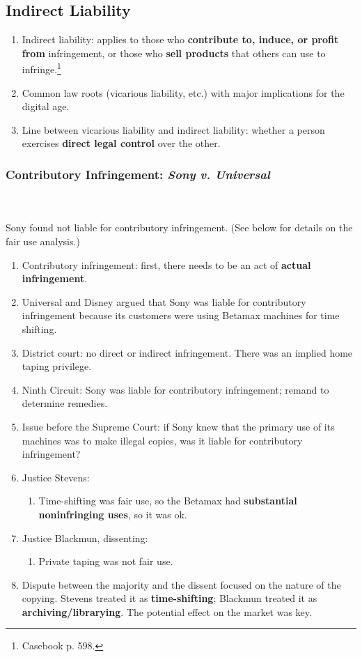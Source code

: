 \subsection{Indirect Liability}

\begin{enumerate}
    \item Indirect liability: applies to those who \textbf{contribute to, 
    induce, or profit from} infringement, or those who \textbf{sell products} 
    that others can use to infringe.\footnote{Casebook p. 598.}
    \item Common law roots (vicarious liability, etc.) with major implications 
    for the digital age.
    \item Line between vicarious liability and indirect liability: whether a 
    person exercises \textbf{direct legal control} over the other.
\end{enumerate}

\subsubsection{Contributory Infringement: \emph{Sony v. Universal}}
~\\\\
Sony found not liable for contributory infringement. (See below for details on 
the fair use analysis.)

\begin{enumerate}
    \item Contributory infringement: first, there needs to be an act of 
    \textbf{actual infringement}.
    \item Universal and Disney argued that Sony was liable for contributory 
    infringement because its customers were using Betamax machines for time 
    shifting.
    \item District court: no direct or indirect infringement. There was an 
    implied home taping privilege.
    \item Ninth Circuit: Sony was liable for contributory infringement; remand 
    to determine remedies.
    \item Issue before the Supreme Court: if Sony knew that the primary use of 
    its machines was to make illegal copies, was it liable for contributory 
    infringement?
    \item Justice Stevens:
    \begin{enumerate}
        \item Time-shifting was fair use, so the Betamax had 
        \textbf{substantial noninfringing uses}, so it was ok.
    \end{enumerate}
    \item Justice Blackmun, dissenting: 
    \begin{enumerate}
        \item Private taping was not fair use.
    \end{enumerate}
    \item Dispute between the majority and the dissent focused on the nature 
    of the copying. Stevens treated it as \textbf{time-shifting}; Blackmun 
    treated it as \textbf{archiving/librarying}. The potential effect on the 
    market was key.
\end{enumerate}

